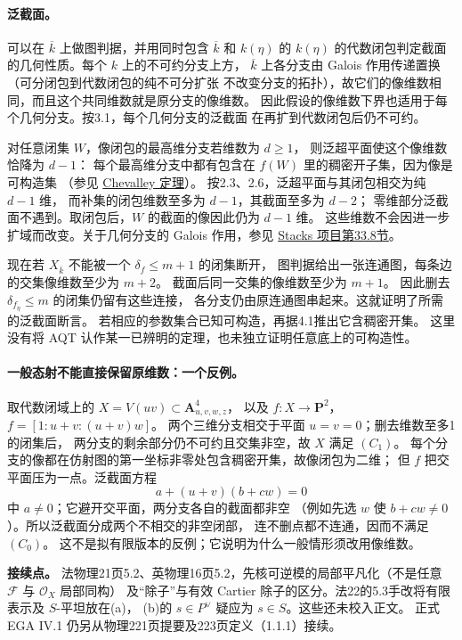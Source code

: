 \documentclass[openany,fontset=fandol]{ctexbook}
\newcommand{\PP}{\mathbf P}
\newcommand{\dd}{\delta}
\begin{document}
\paragraph{泛截面。}
可以在 $\overline k$ 上做图判据，并用同时包含 $\overline k$ 和 $k(\eta)$
的 $k(\eta)$ 的代数闭包判定截面的几何性质。每个 $k$ 上的不可约分支上方，
$\overline k$ 上各分支由 Galois 作用传递置换（可分闭包到代数闭包的纯不可分扩张
不改变分支的拓扑），故它们的像维数相同，而且这个共同维数就是原分支的像维数。
因此假设的像维数下界也适用于每个几何分支。按3.1，每个几何分支的泛截面
在再扩到代数闭包后仍不可约。

对任意闭集 $W$，像闭包的最高维分支若维数为 $d\geq1$，
则泛超平面使这个像维数恰降为 $d-1$：
每个最高维分支中都有包含在 $f(W)$ 里的稠密开子集，因为像是可构造集
（参见 \href{https://stacks.math.columbia.edu/tag/054K}{Chevalley 定理}）。
按2.3、2.6，泛超平面与其闭包相交为纯 $d-1$ 维，
而补集的闭包维数至多为 $d-1$，其截面至多为 $d-2$；
零维部分泛截面不遇到。取闭包后，$W$ 的截面的像因此仍为 $d-1$ 维。
这些维数不会因进一步扩域而改变。关于几何分支的 Galois 作用，参见
\href{https://stacks.math.columbia.edu/tag/0364}{Stacks 项目第33.8节}。

现在若 $X_{\overline k}$ 不能被一个 $\dd_f\leq m+1$ 的闭集断开，
图判据给出一张连通图，每条边的交集像维数至少为 $m+2$。
截面后同一交集的像维数至少为 $m+1$。
因此删去 $\dd_{f_\eta}\leq m$ 的闭集仍留有这些连接，
各分支仍由原连通图串起来。这就证明了所需的泛截面断言。
若相应的参数集合已知可构造，再据4.1推出它含稠密开集。
这里没有将 AQT 认作某一已辨明的定理，也未独立证明任意底上的可构造性。

\paragraph{一般态射不能直接保留原维数：一个反例。}
取代数闭域上的 $X=V(uv)\subset\mathbf A^4_{u,v,w,z}$，
以及 $f:X\to\PP^2$，$f=[1:u+v:(u+v)w]$。
两个三维分支相交于平面 $u=v=0$；删去维数至多1的闭集后，
两分支的剩余部分仍不可约且交集非空，故 $X$ 满足 $(C_1)$。
每个分支的像都在仿射图的第一坐标非零处包含稠密开集，故像闭包为二维；
但 $f$ 把交平面压为一点。泛截面方程
\[
 a+(u+v)(b+cw)=0
\]
中 $a\ne0$；它避开交平面，两分支各自的截面都非空
（例如先选 $w$ 使 $b+cw\ne0$）。所以泛截面分成两个不相交的非空闭部，
连不删点都不连通，因而不满足 $(C_0)$。
这不是拟有限版本的反例；它说明为什么一般情形须改用像维数。

\medskip
\noindent\textbf{接续点。}
法物理21页5.2、英物理16页5.2，先核可逆模的局部平凡化（不是任意 $\mathcal F$ 与 $\mathcal O_X$ 局部同构）
及“除子”与有效 Cartier 除子的区分。法22的5.3手改将有限表示及 $S$-平坦放在(a)，
(b)的 $s\in P^\vee$ 疑应为 $s\in S$。这些还未校入正文。
正式 EGA IV.1 仍另从物理221页提要及223页定义（1.1.1）接续。
\end{document}
